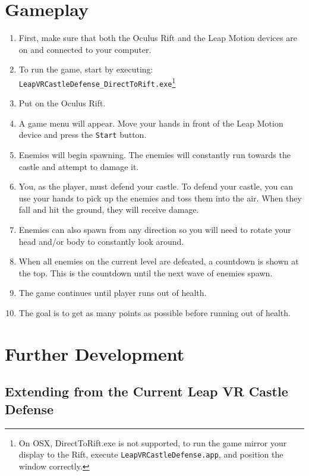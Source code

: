\documentclass[a4paper]{refart}
\begin{document}
\pagebreak

\section{Gameplay}

\begin{enumerate}
	\item First, make sure that both the Oculus Rift and the Leap Motion devices are on and connected to your computer.
	\item To run the game, start by executing:\\
		 \texttt{LeapVRCastleDefense\_DirectToRift.exe}\footnote{On OSX, DirectToRift.exe is not supported, to run the game mirror your display to the Rift, execute \texttt{LeapVRCastleDefense.app}, and position the window correctly.}
	\item Put on the Oculus Rift.
	\item A game menu will appear. Move your hands in front of the Leap Motion device and press the \texttt{Start} button.
	\item Enemies will begin spawning. The enemies will constantly run towards the castle and attempt to damage it. 
	\item You, as the player, must defend your castle. To defend your castle, you can use your hands to pick up the enemies and toss them into the air. When they fall and hit the ground, they will receive damage. 
	\item Enemies can also spawn from any direction so you will need to rotate your head and/or body to constantly look around.
	\item When all enemies on the current level are defeated, a countdown is shown at the top. This is the countdown until the next wave of enemies spawn. 
	\item The game continues until player runs out of health.
	\item The goal is to get as many points as possible before running out of health.
\end{enumerate}

\newpage

\section{Further Development}

\subsection{Extending from the Current Leap VR Castle Defense}
\end{document}
